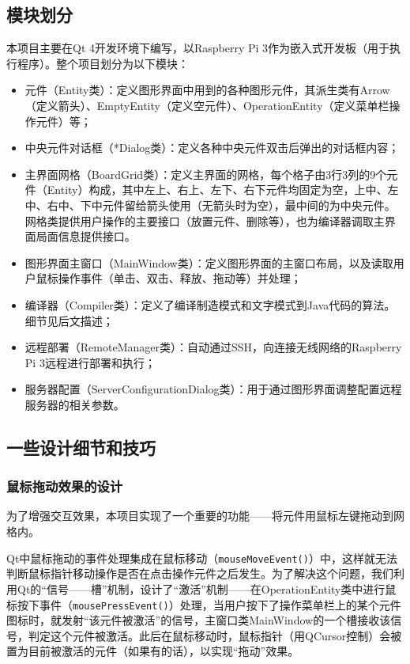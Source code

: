 \documentclass[UTF8]{ctexart}
\begin{document}
\subsection{模块划分}
本项目主要在Qt 4开发环境下编写，以Raspberry Pi 3作为嵌入式开发板（用于执行程序）。整个项目划分为以下模块：
\begin{itemize}
	\item 元件（Entity类）：定义图形界面中用到的各种图形元件，其派生类有Arrow（定义箭头）、EmptyEntity（定义空元件）、OperationEntity（定义菜单栏操作元件）等；
	\item 中央元件对话框（*Dialog类）：定义各种中央元件双击后弹出的对话框内容；
	\item 主界面网格（BoardGrid类）：定义主界面的网格，每个格子由3行3列的9个元件（Entity）构成，其中左上、右上、左下、右下元件均固定为空，上中、左中、右中、下中元件留给箭头使用（无箭头时为空），最中间的为中央元件。网格类提供用户操作的主要接口（放置元件、删除等），也为编译器调取主界面局面信息提供接口。
	\item 图形界面主窗口（MainWindow类）：定义图形界面的主窗口布局，以及读取用户鼠标操作事件（单击、双击、释放、拖动等）并处理；
	\item 编译器（Compiler类）：定义了编译制造模式和文字模式到Java代码的算法。细节见后文描述；
	\item 远程部署（RemoteManager类）：自动通过SSH，向连接无线网络的Raspberry Pi 3远程进行部署和执行；
	\item 服务器配置（ServerConfigurationDialog类）：用于通过图形界面调整配置远程服务器的相关参数。
\end{itemize}

\subsection{一些设计细节和技巧}
\subsubsection{鼠标拖动效果的设计}
为了增强交互效果，本项目实现了一个重要的功能——将元件用鼠标左键拖动到网格内。\par
Qt中鼠标拖动的事件处理集成在鼠标移动（\texttt{mouseMoveEvent()}）中，这样就无法判断鼠标指针移动操作是否在点击操作元件之后发生。为了解决这个问题，我们利用Qt的“信号——槽”机制，设计了“激活”机制——在OperationEntity类中进行鼠标按下事件（\texttt{mousePressEvent()}）处理，当用户按下了操作菜单栏上的某个元件图标时，就发射“该元件被激活”的信号，主窗口类MainWindow的一个槽接收该信号，判定这个元件被激活。此后在鼠标移动时，鼠标指针（用QCursor控制）会被置为目前被激活的元件（如果有的话），以实现“拖动”效果。\par
\end{document}
